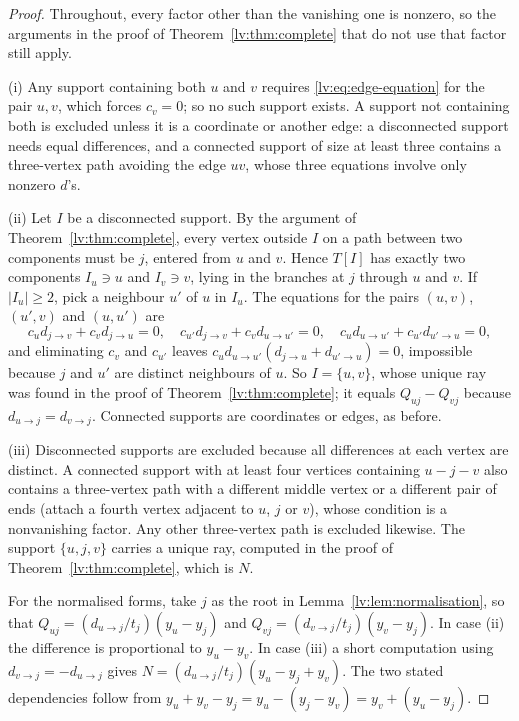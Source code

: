 \documentclass[11pt,a4paper]{article}
\theoremstyle{definition}
\theoremstyle{remark}
\begin{document}
\begin{proof}
Throughout, every factor other than the vanishing one is nonzero, so the arguments in the proof of Theorem~\ref{lv:thm:complete} that do not use that factor still apply.

(i) Any support containing both $u$ and $v$ requires \eqref{lv:eq:edge-equation} for the pair $u,v$, which forces $c_v=0$; so no such support exists. A support not containing both is excluded unless it is a coordinate or another edge: a disconnected support needs equal differences, and a connected support of size at least three contains a three-vertex path avoiding the edge $uv$, whose three equations involve only nonzero $d$'s.

(ii) Let $I$ be a disconnected support. By the argument of Theorem~\ref{lv:thm:complete}, every vertex outside $I$ on a path between two components must be $j$, entered from $u$ and $v$. Hence $T[I]$ has exactly two components $I_u\ni u$ and $I_v\ni v$, lying in the branches at $j$ through $u$ and $v$. If $|I_u|\geq2$, pick a neighbour $u'$ of $u$ in $I_u$. The equations for the pairs $(u,v)$, $(u',v)$ and $(u,u')$ are
\[
 c_ud_{j\to v}+c_vd_{j\to u}=0,\quad
 c_{u'}d_{j\to v}+c_vd_{u\to u'}=0,\quad
 c_ud_{u\to u'}+c_{u'}d_{u'\to u}=0,
\]
and eliminating $c_v$ and $c_{u'}$ leaves $c_u d_{u\to u'}(d_{j\to u}+d_{u'\to u})=0$, impossible because $j$ and $u'$ are distinct neighbours of $u$. So $I=\{u,v\}$, whose unique ray was found in the proof of Theorem~\ref{lv:thm:complete}; it equals $Q_{uj}-Q_{vj}$ because $d_{u\to j}=d_{v\to j}$. Connected supports are coordinates or edges, as before.

(iii) Disconnected supports are excluded because all differences at each vertex are distinct. A connected support with at least four vertices containing $u-j-v$ also contains a three-vertex path with a different middle vertex or a different pair of ends (attach a fourth vertex adjacent to $u$, $j$ or $v$), whose condition is a nonvanishing factor. Any other three-vertex path is excluded likewise. The support $\{u,j,v\}$ carries a unique ray, computed in the proof of Theorem~\ref{lv:thm:complete}, which is $N$.

For the normalised forms, take $j$ as the root in Lemma~\ref{lv:lem:normalisation}, so that $Q_{uj}=(d_{u\to j}/t_j)(y_u-y_j)$ and $Q_{vj}=(d_{v\to j}/t_j)(y_v-y_j)$. In case (ii) the difference is proportional to $y_u-y_v$. In case (iii) a short computation using $d_{v\to j}=-d_{u\to j}$ gives $N=(d_{u\to j}/t_j)(y_u-y_j+y_v)$. The two stated dependencies follow from $y_u+y_v-y_j=y_u-(y_j-y_v)=y_v+(y_u-y_j)$.
\end{proof}
\end{document}
